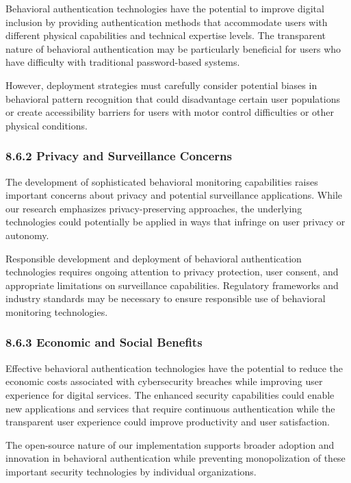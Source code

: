 \documentclass[
  11pt,
  a4paper,
]{article}
\begin{document}
Behavioral authentication technologies have the potential to improve
digital inclusion by providing authentication methods that accommodate
users with different physical capabilities and technical expertise
levels. The transparent nature of behavioral authentication may be
particularly beneficial for users who have difficulty with traditional
password-based systems.

However, deployment strategies must carefully consider potential biases
in behavioral pattern recognition that could disadvantage certain user
populations or create accessibility barriers for users with motor
control difficulties or other physical conditions.

\subsubsection{8.6.2 Privacy and Surveillance
Concerns}\label{privacy-and-surveillance-concerns}

The development of sophisticated behavioral monitoring capabilities
raises important concerns about privacy and potential surveillance
applications. While our research emphasizes privacy-preserving
approaches, the underlying technologies could potentially be applied in
ways that infringe on user privacy or autonomy.

Responsible development and deployment of behavioral authentication
technologies requires ongoing attention to privacy protection, user
consent, and appropriate limitations on surveillance capabilities.
Regulatory frameworks and industry standards may be necessary to ensure
responsible use of behavioral monitoring technologies.

\subsubsection{8.6.3 Economic and Social
Benefits}\label{economic-and-social-benefits}

Effective behavioral authentication technologies have the potential to
reduce the economic costs associated with cybersecurity breaches while
improving user experience for digital services. The enhanced security
capabilities could enable new applications and services that require
continuous authentication while the transparent user experience could
improve productivity and user satisfaction.

The open-source nature of our implementation supports broader adoption
and innovation in behavioral authentication while preventing
monopolization of these important security technologies by individual
organizations.
\end{document}
